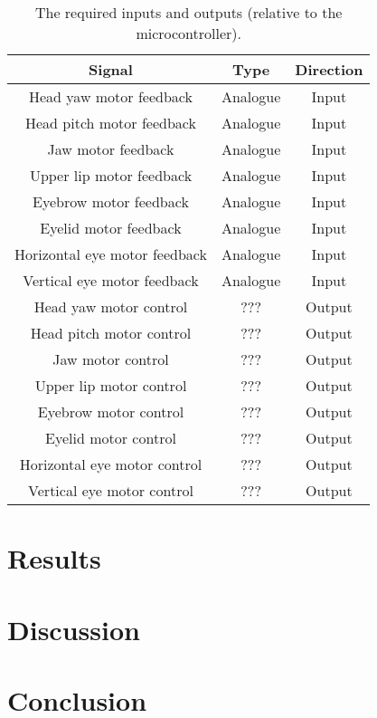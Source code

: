 \documentclass[11pt]{article} %
\begin{document}
\begin{table}[h]
	\label{tab:gpio}
	\caption{The required inputs and outputs (relative to the microcontroller).}
	\centering
	\begin{tabular}{ |c|c|c| }
		\hline
		\textbf{Signal} & \textbf{Type} & \textbf{Direction} \\
		\hline
		Head yaw motor feedback & Analogue & Input \\
		Head pitch motor feedback & Analogue & Input \\
		Jaw motor feedback & Analogue & Input \\
		Upper lip motor feedback & Analogue & Input \\
		Eyebrow motor feedback & Analogue & Input \\
		Eyelid motor feedback & Analogue & Input \\
		Horizontal eye motor feedback & Analogue & Input \\
		Vertical eye motor feedback & Analogue & Input \\
		Head yaw motor control & ??? & Output \\
		Head pitch motor control & ??? & Output \\
		Jaw motor control & ??? & Output \\
		Upper lip motor control & ??? & Output \\
		Eyebrow motor control & ??? & Output \\
		Eyelid motor control & ??? & Output \\
		Horizontal eye motor control & ??? & Output \\
		Vertical eye motor control & ??? & Output \\
		\hline
	\end{tabular}
\end{table}

\section{Results}

\section{Discussion}

\section{Conclusion}
\end{document}
